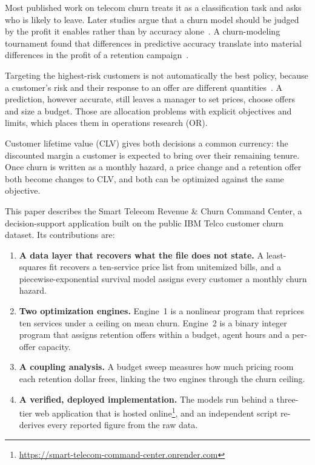 \documentclass[conference]{IEEEtran}
\begin{document}
Most published work on telecom churn treats it as a classification task and asks who is likely to leave. Later studies argue that a churn model should be judged by the profit it enables rather than by accuracy alone~\cite{b2,b3}. A churn-modeling tournament found that differences in predictive accuracy translate into material differences in the profit of a retention campaign~\cite{b4}.

Targeting the highest-risk customers is not automatically the best policy, because a customer's risk and their response to an offer are different quantities~\cite{b5}. A prediction, however accurate, still leaves a manager to set prices, choose offers and size a budget. Those are allocation problems with explicit objectives and limits, which places them in operations research (OR).

Customer lifetime value (CLV) gives both decisions a common currency: the discounted margin a customer is expected to bring over their remaining tenure. Once churn is written as a monthly hazard, a price change and a retention offer both become changes to CLV, and both can be optimized against the same objective.

This paper describes the Smart Telecom Revenue \& Churn Command Center, a decision-support application built on the public IBM Telco customer churn dataset. Its contributions are:
\begin{enumerate}
\item \textbf{A data layer that recovers what the file does not state.} A least-squares fit recovers a ten-service price list from unitemized bills, and a piecewise-exponential survival model assigns every customer a monthly churn hazard.
\item \textbf{Two optimization engines.} Engine~1 is a nonlinear program that reprices ten services under a ceiling on mean churn. Engine~2 is a binary integer program that assigns retention offers within a budget, agent hours and a per-offer capacity.
\item \textbf{A coupling analysis.} A budget sweep measures how much pricing room each retention dollar frees, linking the two engines through the churn ceiling.
\item \textbf{A verified, deployed implementation.} The models run behind a three-tier web application that is hosted online\footnote{\url{https://smart-telecom-command-center.onrender.com}}, and an independent script re-derives every reported figure from the raw data.
\end{enumerate}
\end{document}
